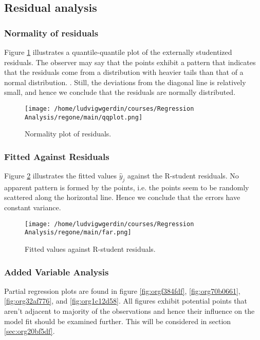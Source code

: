 \documentclass[11pt]{article}
\begin{document}


\subsection{Residual analysis}
\label{sec:orga427a9e}
\subsubsection{Normality of residuals}
\label{sec:org91640b3}

Figure \ref{fig:orgfd3e134} illustrates a quantile-quantile plot of the externally studentized residuals.
The observer may say that the  points exhibit a pattern that indicates that the residuals come from
a distribution with heavier tails than that of a normal distribution. 
\cite{Montgomery2012}. Still, the deviations from the diagonal line is relatively small, and hence
we conclude that the residuals are normally distributed.

\begin{figure}[htbp]
\centering
\texttt{[image: /home/ludvigwgerdin/courses/Regression Analysis/regone/main/qqplot.png]}
\caption{\label{fig:orgfd3e134}
Normality plot of residuals.}
\end{figure}

\subsubsection{Fitted Against Residuals}
\label{sec:org8c9117a}

Figure \ref{fig:org596d012} illustrates the fitted values \(\hat y_j\) against the R-student residuals. No apparent 
pattern is formed by the points, i.e. the points seem to be randomly scattered along the horizontal line.
Hence we conclude that the errors have constant variance.

\begin{figure}[htbp]
\centering
\texttt{[image: /home/ludvigwgerdin/courses/Regression Analysis/regone/main/far.png]}
\caption{\label{fig:org596d012}
Fitted values against R-student residuals.}
\end{figure}

\subsubsection{Added Variable Analysis}
\label{sec:org9606cee}

Partial regression plots are found in figure \ref{fig:orgf384fdf}, \ref{fig:org70b0661},
\ref{fig:org32af776}, and \ref{fig:org1c12d58}. All figures exhibit potential points 
that aren't adjacent to majority of the observations and hence their influence on the model fit should be 
examined further. This will be considered in section \ref{sec:org20bf5df}.
\end{document}

